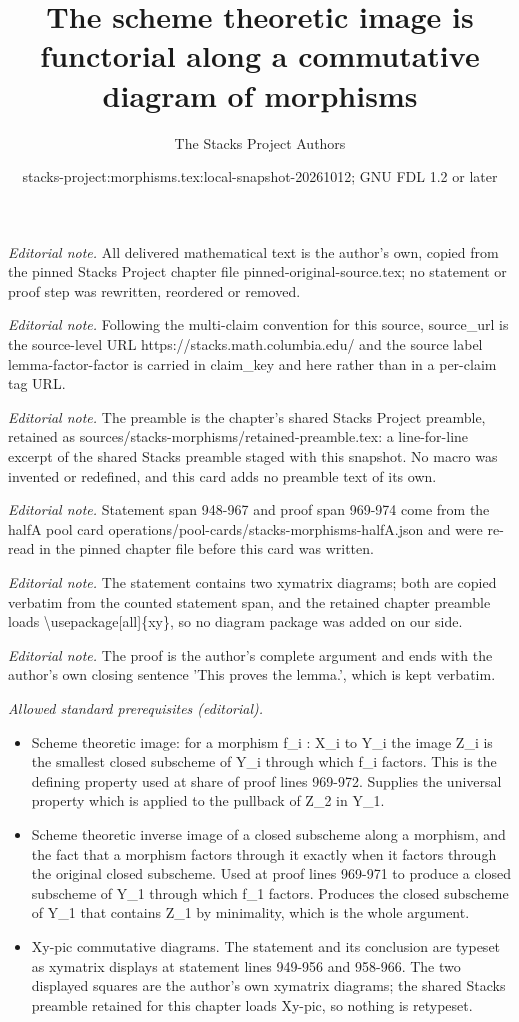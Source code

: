 \documentclass[10pt,a4paper]{amsart}
\title{The scheme theoretic image is functorial along a commutative diagram of morphisms}
\author{The Stacks Project Authors}
\date{stacks-project:morphisms.tex:local-snapshot-20261012; GNU FDL 1.2 or later}
\theoremstyle{plain}
\theoremstyle{definition}
\theoremstyle{remark}
\numberwithin{equation}{subsection}
\begin{document}
\maketitle
\noindent\textit{Editorial note.} All delivered mathematical text is the author's own, copied from the pinned Stacks Project chapter file pinned-original-source.tex; no statement or proof step was rewritten, reordered or removed.\par\medskip
\noindent\textit{Editorial note.} Following the multi-claim convention for this source, source\_url is the source-level URL https://stacks.math.columbia.edu/ and the source label lemma-factor-factor is carried in claim\_key and here rather than in a per-claim tag URL.\par\medskip
\noindent\textit{Editorial note.} The preamble is the chapter's shared Stacks Project preamble, retained as sources/stacks-morphisms/retained-preamble.tex: a line-for-line excerpt of the shared Stacks preamble staged with this snapshot. No macro was invented or redefined, and this card adds no preamble text of its own.\par\medskip
\noindent\textit{Editorial note.} Statement span 948-967 and proof span 969-974 come from the halfA pool card operations/pool-cards/stacks-morphisms-halfA.json and were re-read in the pinned chapter file before this card was written.\par\medskip
\noindent\textit{Editorial note.} The statement contains two xymatrix diagrams; both are copied verbatim from the counted statement span, and the retained chapter preamble loads \textbackslash{}usepackage[all]\{xy\}, so no diagram package was added on our side.\par\medskip
\noindent\textit{Editorial note.} The proof is the author's complete argument and ends with the author's own closing sentence 'This proves the lemma.', which is kept verbatim.\par\medskip
\noindent\textit{Allowed standard prerequisites (editorial).}\begin{itemize}
\item Scheme theoretic image: for a morphism f\_i : X\_i to Y\_i the image Z\_i is the smallest closed subscheme of Y\_i through which f\_i factors. This is the defining property used at share of proof lines 969-972. Supplies the universal property which is applied to the pullback of Z\_2 in Y\_1.
\item Scheme theoretic inverse image of a closed subscheme along a morphism, and the fact that a morphism factors through it exactly when it factors through the original closed subscheme. Used at proof lines 969-971 to produce a closed subscheme of Y\_1 through which f\_1 factors. Produces the closed subscheme of Y\_1 that contains Z\_1 by minimality, which is the whole argument.
\item Xy-pic commutative diagrams. The statement and its conclusion are typeset as xymatrix displays at statement lines 949-956 and 958-966. The two displayed squares are the author's own xymatrix diagrams; the shared Stacks preamble retained for this chapter loads Xy-pic, so nothing is retypeset.
\end{itemize}\medskip
\end{document}
